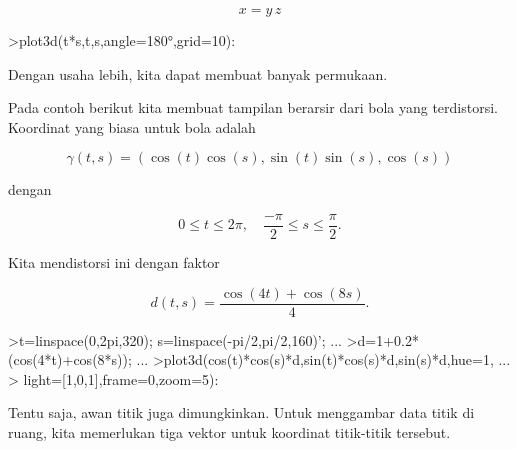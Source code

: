 \documentclass[a4paper,10pt]{article}
\begin{document}
\begin{eulernotebook}
\begin{eulercomment}
\end{eulercomment}
\begin{eulerformula}
\[
x = y \, z
\]
\end{eulerformula}
\begin{eulerprompt}
>plot3d(t*s,t,s,angle=180°,grid=10):
\end{eulerprompt}
\begin{eulercomment}
Dengan usaha lebih, kita dapat membuat banyak permukaan.

Pada contoh berikut kita membuat tampilan berarsir dari bola yang terdistorsi. Koordinat yang biasa untuk bola
adalah

\end{eulercomment}
\begin{eulerformula}
\[
\gamma(t,s) = (\cos(t)\cos(s),\sin(t)\sin(s),\cos(s))
\]
\end{eulerformula}
\begin{eulercomment}
dengan

\end{eulercomment}
\begin{eulerformula}
\[
0 \le t \le 2\pi, \quad \frac{-\pi}{2} \le s \le \frac{\pi}{2}.
\]
\end{eulerformula}
\begin{eulercomment}
Kita mendistorsi ini dengan faktor

\end{eulercomment}
\begin{eulerformula}
\[
d(t,s) = \frac{\cos(4t)+\cos(8s)}{4}.
\]
\end{eulerformula}
\begin{eulerprompt}
>t=linspace(0,2pi,320); s=linspace(-pi/2,pi/2,160)'; ...
>d=1+0.2*(cos(4*t)+cos(8*s)); ...
>plot3d(cos(t)*cos(s)*d,sin(t)*cos(s)*d,sin(s)*d,hue=1, ...
>  light=[1,0,1],frame=0,zoom=5):
\end{eulerprompt}
\begin{eulercomment}
Tentu saja, awan titik juga dimungkinkan. Untuk menggambar data titik di ruang, kita memerlukan tiga vektor untuk
koordinat titik-titik tersebut.


\end{eulercomment}
\end{eulernotebook}
\end{document}
